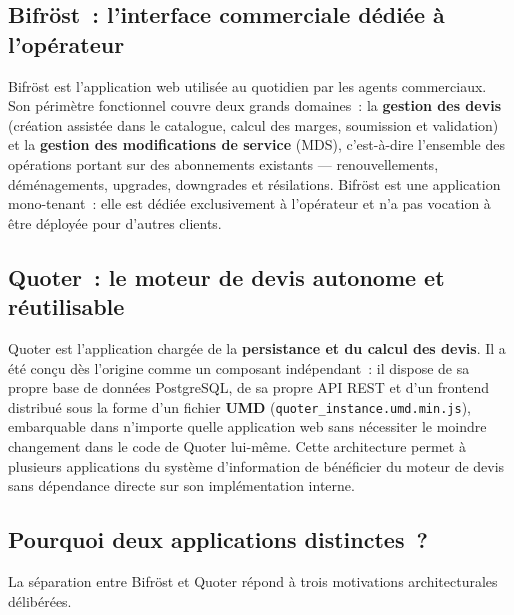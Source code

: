 \subsection{Bifr\"ost~: l'interface commerciale d\'edi\'ee \`a l'op\'erateur}

Bifr\"ost est l'application web utilis\'ee au quotidien par les agents commerciaux. Son p\'erim\`etre fonctionnel couvre deux grands domaines~: la \textbf{gestion des devis} (cr\'eation assist\'ee dans le catalogue, calcul des marges, soumission et validation) et la \textbf{gestion des modifications de service} (MDS), c'est-\`a-dire l'ensemble des op\'erations portant sur des abonnements existants --- renouvellements, d\'em\'enagements, upgrades, downgrades et r\'esilations. Bifr\"ost est une application mono-tenant~: elle est d\'edi\'ee exclusivement \`a l'op\'erateur et n'a pas vocation \`a \^etre d\'eploy\'ee pour d'autres clients.

\subsection{Quoter~: le moteur de devis autonome et r\'eutilisable}

Quoter est l'application charg\'ee de la \textbf{persistance et du calcul des devis}. Il a \'et\'e con\c{c}u d\`es l'origine comme un composant ind\'ependant~: il dispose de sa propre base de donn\'ees PostgreSQL, de sa propre API REST et d'un frontend distribu\'e sous la forme d'un fichier \textbf{UMD} (\texttt{quoter\_instance.umd.min.js}), embarquable dans n'importe quelle application web sans n\'ecessiter le moindre changement dans le code de Quoter lui-m\^eme. Cette architecture permet \`a plusieurs applications du syst\`eme d'information de b\'en\'eficier du moteur de devis sans d\'ependance directe sur son impl\'ementation interne.

\subsection{Pourquoi deux applications distinctes~?}

La s\'eparation entre Bifr\"ost et Quoter r\'epond \`a trois motivations architecturales d\'elib\'er\'ees.

